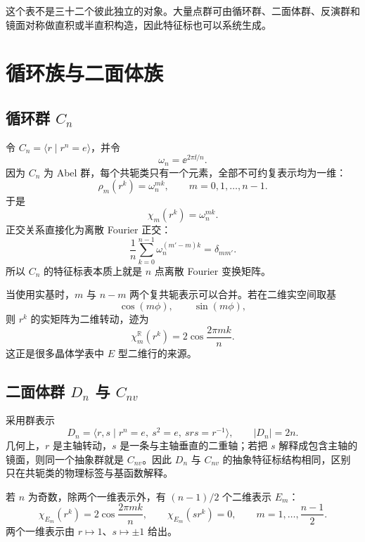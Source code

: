 这个表不是三十二个彼此独立的对象。大量点群可由循环群、二面体群、反演群和镜面对称做直积或半直积构造，因此特征标也可以系统生成。

\section{循环族与二面体族}

\subsection{\texorpdfstring{循环群 $C_n$}{循环群 Cn}}

令 $C_n=\langle r\mid r^n=e\rangle$，并令
\[
\omega_n=\ee^{2\pi\ii/n}.
\]
因为 $C_n$ 为 Abel 群，每个共轭类只有一个元素，全部不可约复表示均为一维：
\begin{equation}
\rho_m(r^k)=\omega_n^{mk},
\qquad m=0,1,\dots,n-1.
\label{eq:cn-characters-app}
\end{equation}
于是
\[
\chi_m(r^k)=\omega_n^{mk}.
\]
正交关系直接化为离散 Fourier 正交：
\[
\frac1n\sum_{k=0}^{n-1}\omega_n^{(m'-m)k}=\delta_{mm'}.
\]
所以 $C_n$ 的特征标表本质上就是 $n$ 点离散 Fourier 变换矩阵。

当使用实基时，$m$ 与 $n-m$ 两个复共轭表示可以合并。若在二维实空间取基
\[
\cos(m\phi),\qquad \sin(m\phi),
\]
则 $r^k$ 的实矩阵为二维转动，迹为
\begin{equation}
\chi^{\mathbb R}_m(r^k)=2\cos\frac{2\pi mk}{n}.
\label{eq:cn-real-character}
\end{equation}
这正是很多晶体学表中 $E$ 型二维行的来源。

\subsection{\texorpdfstring{二面体群 $D_n$ 与 $C_{nv}$}{二面体群 Dn 与 Cnv}}

采用群表示
\[
D_n=\langle r,s\mid r^n=e,\ s^2=e,\ srs=r^{-1}\rangle,
\qquad |D_n|=2n.
\]
几何上，$r$ 是主轴转动，$s$ 是一条与主轴垂直的二重轴；若把 $s$ 解释成包含主轴的镜面，则同一个抽象群就是 $C_{nv}$。因此 $D_n$ 与 $C_{nv}$ 的抽象特征标结构相同，区别只在共轭类的物理标签与基函数解释。

若 $n$ 为奇数，除两个一维表示外，有 $(n-1)/2$ 个二维表示 $E_m$：
\begin{equation}
\chi_{E_m}(r^k)=2\cos\frac{2\pi mk}{n},
\qquad
\chi_{E_m}(sr^k)=0,
\qquad
m=1,\dots,\frac{n-1}{2}.
\label{eq:dn-odd-char}
\end{equation}
两个一维表示由 $r\mapsto1$、$s\mapsto\pm1$ 给出。

